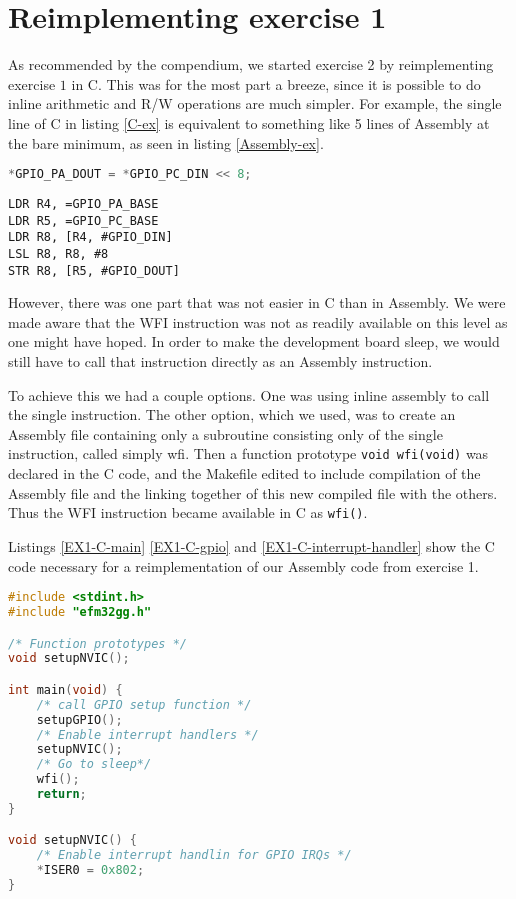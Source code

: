 \section{Reimplementing exercise 1}

As recommended by the compendium, we started exercise 2 by reimplementing exercise $1$ in C. This was for the most part a breeze, since it is possible to do inline arithmetic and R/W operations are much simpler. For example, the single line of C in listing \ref{C-ex} is equivalent to something like 5 lines of Assembly at the bare minimum, as seen in listing \ref{Assembly-ex}.

\begin{lstlisting}[language=C,label=C-ex,caption=C]
*GPIO_PA_DOUT = *GPIO_PC_DIN << 8;
\end{lstlisting}

\begin{lstlisting}[label=Assembly-ex,caption=ASM]
LDR R4, =GPIO_PA_BASE
LDR R5, =GPIO_PC_BASE
LDR R8, [R4, #GPIO_DIN]
LSL R8, R8, #8
STR R8, [R5, #GPIO_DOUT]
\end{lstlisting}


However, there was one part that was not easier in C than in Assembly. We were made aware that the WFI instruction was not as readily available on this level as one might have hoped. In order to make the development board sleep, we would still have to call that instruction directly as an Assembly instruction.

To achieve this we had a couple options. One was using inline assembly to call the single instruction. The other option, which we used, was to create an Assembly file containing only a subroutine consisting only of the single instruction, called simply wfi. Then a function prototype \texttt{void wfi(void)} was declared in the C code, and the Makefile edited to include compilation of the Assembly file and the linking together of this new compiled file with the others. Thus the WFI instruction became available in C as \texttt{wfi()}.

Listings \ref{EX1-C-main} \ref{EX1-C-gpio} and \ref{EX1-C-interrupt-handler} show the C code necessary for a reimplementation of our Assembly code from exercise 1. 

\begin{minipage}{\linewidth}
\begin{lstlisting}[language=C, label=EX1-C-main, caption=main.c]
#include <stdint.h>
#include "efm32gg.h"

/* Function prototypes */
void setupNVIC();

int main(void) {
    /* call GPIO setup function */
    setupGPIO();
    /* Enable interrupt handlers */
    setupNVIC();
    /* Go to sleep*/
    wfi();
    return;
}

void setupNVIC() {
    /* Enable interrupt handlin for GPIO IRQs */
    *ISER0 = 0x802;
}
\end{lstlisting}
\end{minipage}

